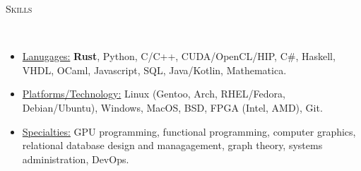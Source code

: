 \documentclass[9pt]{article}
\newenvironment{changemargin}[2]{%
  \begin{list}{}{%
    \setlength{\topsep}{0pt}%
    \setlength{\leftmargin}{#1}%
    \setlength{\rightmargin}{#2}%
    \setlength{\listparindent}{\parindent}%
    \setlength{\itemindent}{\parindent}%
    \setlength{\parsep}{\parskip}%
  }%
  \item[]}{\end{list}
}
\newcommand{\lineover}{
	\begin{changemargin}{-0.05in}{-0.05in}
		\vspace*{-8pt}
		\hrulefill \\
		\vspace*{-2pt}
	\end{changemargin}
}
\newcommand{\header}[1]{
	\begin{changemargin}{-0.5in}{-0.5in}
		\scshape{#1}\\
  	\lineover
	\end{changemargin}
}
\newenvironment{body} {
	\vspace*{-16pt}
	\begin{changemargin}{-0.25in}{-0.5in}
  }	
	{\end{changemargin}
}
\begin{document}
\begin{body}
	\smallskip
	\vspace*{-3pt}
	\vspace*{-5pt}
	\smallskip
\end{body}


\smallskip

\header{Skills}
\smallskip
\begin{body}
	\vspace{14pt}
	\begin{itemize} \itemsep -0pt

		\item \uline{Lanugages:} \textbf{Rust}, Python, C/C++, CUDA/OpenCL/HIP, C\#, Haskell, VHDL, OCaml, Javascript, SQL, Java/Kotlin, Mathematica.

		\item \uline{Platforms/Technology:} Linux (Gentoo, Arch, RHEL/Fedora,
		Debian/Ubuntu), Windows, MacOS,
		      BSD, FPGA (Intel, AMD), Git.
		\item \uline{Specialties:} GPU programming, functional programming, computer graphics, relational database design and managagement, graph theory, systems administration, DevOps.
	\end{itemize}
\end{body}
\end{document}
